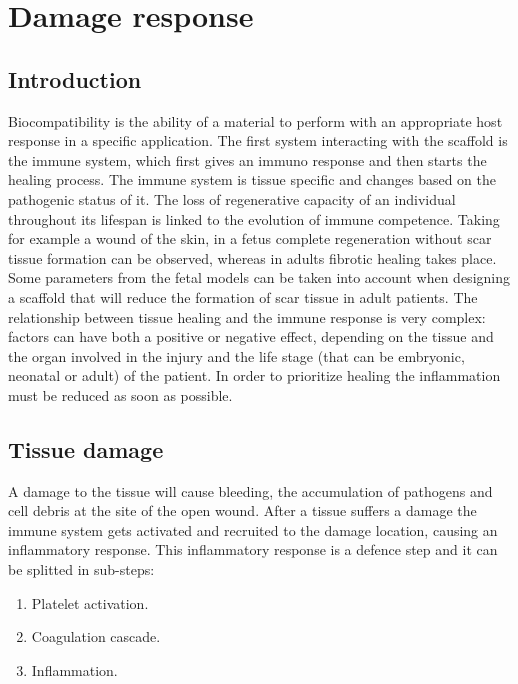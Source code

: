 \graphicspath{{chapters/04/images/}}
\chapter{Damage response}

\section{Introduction}
Biocompatibility is the ability of a material to perform with an appropriate host response in a specific application.
The first system interacting with the scaffold is the immune system, which first gives an immuno response and then starts the healing process.
The immune system is tissue specific and changes based on the pathogenic status of it.
The loss of regenerative capacity of an individual throughout its lifespan is linked to the evolution of immune competence.
Taking for example a wound of the skin, in a fetus complete regeneration without scar tissue formation can be observed, whereas in adults fibrotic healing takes place.
Some parameters from the fetal models can be taken into account when designing a scaffold that will reduce the formation of scar tissue in adult patients.
The relationship between tissue healing and the immune response is very complex: factors can have both a positive or negative effect, depending on the tissue and the organ involved in the injury and the life stage (that can be embryonic, neonatal or adult) of the patient.
In order to prioritize healing the inflammation must be reduced as soon as possible.

\section{Tissue damage}
A damage to the tissue will cause bleeding, the accumulation of pathogens and cell debris at the site of the open wound.
After a tissue suffers a damage the immune system gets activated and recruited to the damage location, causing an inflammatory response.
This inflammatory response is a defence step and it can be splitted in sub-steps:

\begin{multicols}{2}
	\begin{enumerate}
		\item Platelet activation.
		\item Coagulation cascade.
		\item Inflammation.
	\end{enumerate}
\end{multicols}

